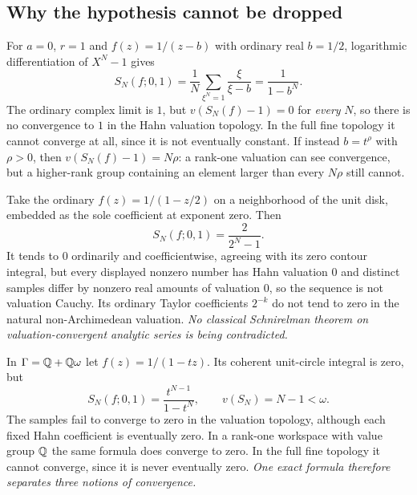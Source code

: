 \documentclass[11pt,letterpaper]{article}
\theoremstyle{definition}
\theoremstyle{remark}
\numberwithin{equation}{section}
\begin{document}
\subsection{Why the hypothesis cannot be dropped}
\begin{example}
\label{contours:ex:quadrature}
For $a=0$, $r=1$ and $f(z)=1/(z-b)$ with ordinary real $b=1/2$, logarithmic
differentiation of $X^N-1$ gives
\[
  S_N(f;0,1)=\frac1N\sum_{\xi^N=1}\frac{\xi}{\xi-b}=\frac1{1-b^N} .
\]
The ordinary complex limit is $1$, but $v(S_N(f)-1)=0$ for \emph{every} $N$, so
there is no convergence to $1$ in the Hahn valuation topology. In the full fine
topology it cannot converge at all, since it is not eventually constant. If instead
$b=t^\rho$ with $\rho>0$, then $v(S_N(f)-1)=N\rho$: a rank-one valuation can see
convergence, but a higher-rank group containing an element larger than every $N\rho$
still cannot.
\end{example}

\begin{example}
\label{contours:ex:ordinarysampling}
Take the ordinary $f(z)=1/(1-z/2)$ on a neighborhood of the unit disk, embedded as
the sole coefficient at exponent zero. Then
\begin{equation}\label{contours:eq:ordinarysample}
  S_N(f;0,1)=\frac{2}{2^N-1}.
\end{equation}
It tends to $0$ ordinarily and coefficientwise, agreeing with its zero contour
integral, but every displayed nonzero number has Hahn valuation $0$ and distinct
samples differ by nonzero real amounts of valuation $0$, so the sequence is not
valuation Cauchy. Its ordinary Taylor coefficients $2^{-k}$ do not tend to zero in
the natural non-Archimedean valuation. \emph{No classical Schnirelman theorem on
valuation-convergent analytic series is being contradicted.}
\end{example}

\begin{example}
\label{contours:ex:highranksampling}
In $\Gamma=\mathbb Q+\mathbb Q\omega$ let $f(z)=1/(1-tz)$. Its coherent unit-circle integral is
zero, but
\begin{equation}\label{contours:eq:highranksample}
  S_N(f;0,1)=\frac{t^{N-1}}{1-t^N},\qquad v(S_N)=N-1<\omega .
\end{equation}
The samples fail to converge to zero in the valuation topology, although each fixed
Hahn coefficient is eventually zero. In a rank-one workspace with value group $\mathbb Q$
the same formula does converge to zero. In the full fine topology it cannot
converge, since it is never eventually zero. \emph{One exact formula therefore
separates three notions of convergence.}
\end{example}
\end{document}
